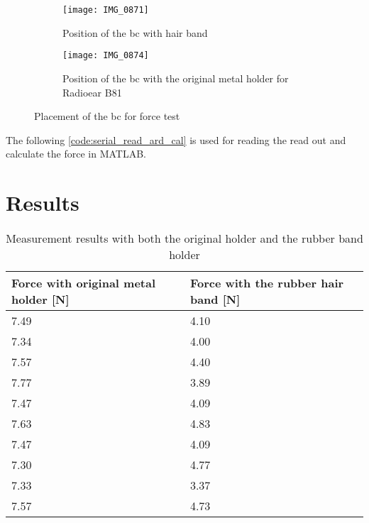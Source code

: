 \begin{figure}[H]
\centering
\begin{subfigure}[htbp]{0.33\textwidth}
		\texttt{[image: IMG\_0871]}
		\caption{Position of the \gls{bc} with hair band}
		\label{fig:bc_hair_band}
\end{subfigure}\vspace{10pt}
\begin{subfigure}[htbp]{0.60\textwidth}
		\texttt{[image: IMG\_0874]}
		\caption{Position of the \gls{bc} with the original metal holder for Radioear B81}
		\label{fig:bc_metal_holder}
\end{subfigure} \hspace{10pt}
\caption{Placement of the \gls{bc} for force test}
\label{fig:bc_holder}
\end{figure}


The following \autoref{code:serial_read_ard_cal} is used for reading the read out and calculate the force in MATLAB.



\section*{Results}


\begin{table}[H]
\centering
\caption{Measurement results with both the original holder and the rubber band holder}
\label{apend:weight_result}
\begin{tabular}{l|l}
Force with original metal holder [\si{\newton}] & Force with the rubber hair band [\si{\newton}] \\ \hline
7.49                                           & 4.10                                          \\
7.34                                           & 4.00                                          \\
7.57                                           & 4.40                                          \\
7.77                                           & 3.89                                          \\
7.47                                           & 4.09                                          \\
7.63                                           & 4.83                                          \\
7.47                                           & 4.09                                          \\
7.30                                           & 4.77                                          \\
7.33                                           & 3.37                                          \\
7.57                                           & 4.73                                         
\end{tabular}
\end{table}

